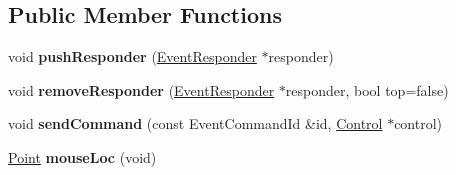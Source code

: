\subsection*{Public Member Functions}
\begin{DoxyCompactItemize}
\item 
void {\bfseries push\+Responder} (\hyperlink{classEventResponder}{Event\+Responder} $\ast$responder)\hypertarget{classEventManager_ad08661baf935449c53e99c44325c7e1b}{}\label{classEventManager_ad08661baf935449c53e99c44325c7e1b}

\item 
void {\bfseries remove\+Responder} (\hyperlink{classEventResponder}{Event\+Responder} $\ast$responder, bool top=false)\hypertarget{classEventManager_ad4618279e658f2a63f90866760dc3c5d}{}\label{classEventManager_ad4618279e658f2a63f90866760dc3c5d}

\item 
void {\bfseries send\+Command} (const Event\+Command\+Id \&id, \hyperlink{classControl}{Control} $\ast$control)\hypertarget{classEventManager_a00ade079f81b3e1a46dcc64daa21b101}{}\label{classEventManager_a00ade079f81b3e1a46dcc64daa21b101}

\item 
\hyperlink{classPoint}{Point} {\bfseries mouse\+Loc} (void)\hypertarget{classEventManager_ac8f7e971c5e7d2aa22a1d5cd35350bfd}{}\label{classEventManager_ac8f7e971c5e7d2aa22a1d5cd35350bfd}

\end{DoxyCompactItemize}
